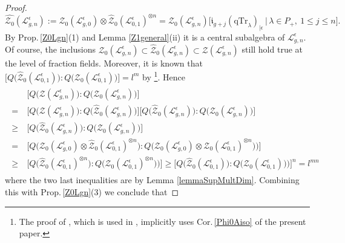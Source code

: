 \documentclass[11pt]{amsart}
\newcommand{\e}{\epsilon}
\begin{document}
\begin{proof}
\begin{equation}\label{defHatZ0Lgn}
\hat{\mathcal{Z}_0}(\mathcal{L}_{g,n}^\e) := \mathcal{Z}_0(\mathcal{L}_{g,0}^\e) \otimes \hat{\mathcal{Z}}_0(\mathcal{L}_{0,1}^\e)^{\otimes n} =  \mathcal{Z}_0(\mathcal{L}_{g,n}^\e)\bigl[ \mathfrak{i}_{g+j}(\mathrm{qTr}_\lambda)_{|\e} \,\big|\, \lambda \in P_+, \: 1 \leq j \leq n \bigr].
\end{equation}
By Prop.\,\ref{Z0Lgn}(1) and Lemma \ref{Z1general}(ii) it is a central subalgebra of $\mathcal{L}_{g,n}^\e$.
Of course, the inclusions $\mathcal{Z}_0(\mathcal{L}_{g,n}^\e) \subset \hat{\mathcal{Z}}_0(\mathcal{L}_{g,n}^\e) \subset \mathcal{Z}(\mathcal{L}_{g,n}^\e)$  still hold true at the level of fraction fields.  Moreover, it is known that $\bigl[ Q\bigl(\hat{\mathcal{Z}}_0(\mathcal{L}_{0,1}^\e)\bigr) : Q\bigl(\mathcal{Z}_0(\mathcal{L}_{0,1}^\e)\bigr) \bigr] = l^m$ by \cite[Rmk.\,5.3]{BR2}\footnote{The proof of \cite[Th.\,5.2]{BR2}, which is used in \cite[Rmk.\,5.3]{BR2}, implicitly uses Cor.\,\ref{Phi0Aiso} of the present paper.}. Hence
\begin{align}
\begin{split}\label{majorationDegZoverZ0}
&\bigl[ Q\bigl(\mathcal{Z}(\mathcal{L}_{g,n}^\e)\bigr) : Q\bigl(\mathcal{Z}_0(\mathcal{L}_{g,n}^\e)\bigr) \bigr]\\
=\:& \bigl[ Q\bigl(\mathcal{Z}(\mathcal{L}_{g,n}^\e)\bigr) : Q\bigl(\hat{\mathcal{Z}}_0(\mathcal{L}_{g,n}^\e)\bigr) \bigr] \bigl[ Q\bigl(\hat{\mathcal{Z}}_0(\mathcal{L}_{g,n}^\e)\bigr) : Q\bigl(\mathcal{Z}_0(\mathcal{L}_{g,n}^\e)\bigr) \bigr]\\
\geq\:&\bigl[ Q\bigl(\hat{\mathcal{Z}}_0(\mathcal{L}_{g,n}^\e)\bigr) : Q\bigl(\mathcal{Z}_0(\mathcal{L}_{g,n}^\e)\bigr) \bigr]\\
=\:&\bigl[ Q\bigl(\mathcal{Z}_0(\mathcal{L}_{g,0}^\e) \otimes \hat{\mathcal{Z}}_0(\mathcal{L}_{0,1}^\e)^{\otimes n}\bigr) : Q\bigl(\mathcal{Z}_0(\mathcal{L}_{g,0}^\e) \otimes \mathcal{Z}_0(\mathcal{L}_{0,1}^\e)^{\otimes n})\bigr) \bigr]\\
\geq\:&\bigl[ Q\bigl(\hat{\mathcal{Z}}_0(\mathcal{L}_{0,1}^\e)^{\otimes n}\bigr) : Q\bigl(\mathcal{Z}_0(\mathcal{L}_{0,1}^\e)^{\otimes n})\bigr) \bigr] \geq \bigl[ Q\bigl(\hat{\mathcal{Z}}_0(\mathcal{L}_{0,1}^\e)\bigr) : Q\bigl(\mathcal{Z}_0(\mathcal{L}_{0,1}^\e))\bigr) \bigr]^n = l^{mn}
\end{split}
\end{align}
where the two last inequalities are by Lemma \ref{lemmaSupMultDim}. Combining this with Prop.\,\ref{Z0Lgn}(3) we conclude that

\end{proof}
\end{document}
